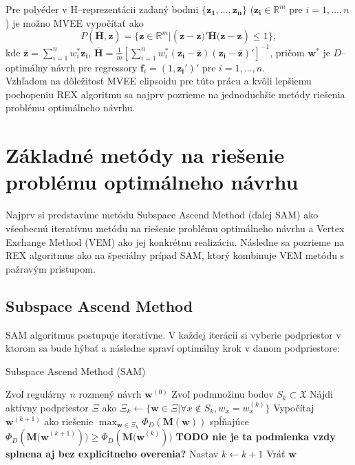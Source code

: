 Pre polyéder v H--reprezentácii zadaný bodmi $\{ \mathbf{z_1, \dots, z_n} \}$ ($\mathbf{z_i} \in \mathbb{R}^m$ pre $i=1,\dots, n$) je možno MVEE vypočítať ako $$P(\mathbf{\overline H, \overline z})= \{ \mathbf{z} \in \mathbb{R}^m | (\mathbf{z-\overline z)'\overline H(z-\overline z}) \le 1 \}, $$ kde $\mathbf{\overline z}=\sum_{i=1}^n w_i^*\mathbf{z_i}$, $\mathbf{\overline H}=\frac{1}{m} \left[ \sum_{i=1}^n w_i^*\mathbf{(z_i-\overline z)(z_i-\overline z)'} \right]^{-1} $, pričom $\mathbf{w^*}$ je $D$--optimálny návrh pre regressory $\mathbf{f}_i=(1,\mathbf{z_i}')'$ pre $i=1,\dots, n$.\\

Vzhľadom na dôležitosť MVEE elipsoidu pre túto prácu a kvôli lepšiemu pochopeniu REX algoritmu sa najprv pozrieme na jednoduchšie metódy riešenia problému optimálneho návrhu.

\section{Základné metódy na riešenie problému optimálneho návrhu}

Najprv si predstavíme metódu Subspace Ascend Method (ďalej SAM) ako všeobecnú iteratívnu metódu na riešenie problému optimálneho návrhu a Vertex Exchange Method (VEM) ako jej konkrétnu realizáciu. Následne sa pozrieme na REX algoritmus ako na špeciálny prípad SAM, ktorý kombinuje VEM metódu s pažravým prístupom.

\subsection{Subspace Ascend Method}

SAM algoritmus postupuje iteratívne. V každej iterácii si vyberie podpriestor v ktorom sa bude hýbať a následne spraví optimálny krok v danom podpriestore:

\begin{algorithm}[H]
	\caption{Subspace Ascend Method (SAM) \cite{rex_harman}}
	\label{sam}
	\begin{algorithmic}[1]
		\State Zvoľ regulárny $n$ rozmený návrh $\mathbf w^{(0)}$
			\State Zvoľ podmnožinu bodov $S_k \subset \mathfrak X$
			\State Nájdi aktívny podpriestor $\Xi$ ako $\Xi_k \leftarrow \{ \mathbf w \in \Xi | \forall x \not \in S_k, w_x = w_x^{(k)} \}$
			\State Vypočítaj $\mathbf w^{(k+1)}$ ako riešenie $\max_{\mathbf w \in \Xi_k} \Phi_D(\mathbf{M(w)})$ spĺňajúce $\Phi_D(\mathbf {M(w}^{(k+1)})) \geq \Phi_D(\mathbf{M(w}^{(k)}))$ \textbf{TODO nie je ta podmienka vzdy splnena aj bez explicitneho overenia?}
			\State Nastav $k \leftarrow k+1$
		\EndWhile
		\State Vráť $\mathbf w$
	\end{algorithmic}
\end{algorithm}

